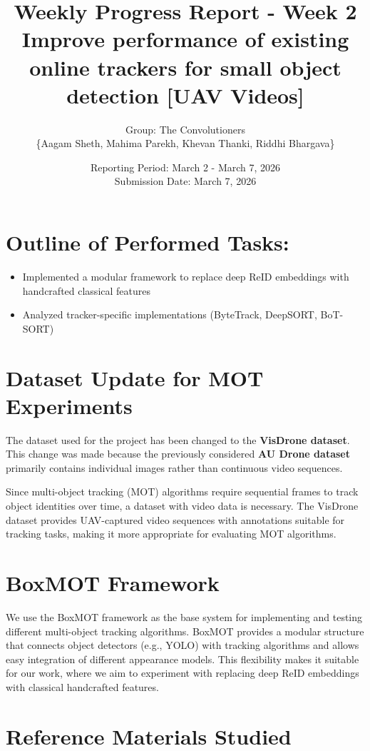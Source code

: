 \documentclass[11pt,a4paper]{article}
\title{\textbf{Weekly Progress Report - Week 2} \\
	\large Improve performance of existing online trackers for small object detection [UAV Videos]}
\author{Group: The Convolutioners\\\{Aagam Sheth, Mahima Parekh, Khevan Thanki, Riddhi Bhargava\}}
\date{Reporting Period: March 2 - March 7, 2026 \\
	Submission Date: March 7, 2026}
\begin{document}
	
	\maketitle
	
	\section*{Outline of Performed Tasks:}
	\begin{itemize}[leftmargin=*]
		\item Implemented a modular framework to replace deep ReID embeddings with handcrafted classical features
		\item Analyzed tracker-specific implementations (ByteTrack, DeepSORT, BoT-SORT)
	\end{itemize}
	
	\section*{Dataset Update for MOT Experiments}
	The dataset used for the project has been changed to the \textbf{VisDrone dataset}. 
	This change was made because the previously considered \textbf{AU Drone dataset} primarily contains individual images rather than continuous video sequences.
	
	Since multi-object tracking (MOT) algorithms require sequential frames to track object identities over time, a dataset with video data is necessary. 
	The VisDrone dataset provides UAV-captured video sequences with annotations suitable for tracking tasks, making it more appropriate for evaluating MOT algorithms.
	
		\section*{BoxMOT Framework}
	We use the BoxMOT framework as the base system for implementing and testing different multi-object tracking algorithms. 
	BoxMOT provides a modular structure that connects object detectors (e.g., YOLO) with tracking algorithms and allows easy 
	integration of different appearance models. This flexibility makes it suitable for our work, where we aim to experiment 
	with replacing deep ReID embeddings with classical handcrafted features.
	
	\section*{Reference Materials Studied}
	
\end{document}
